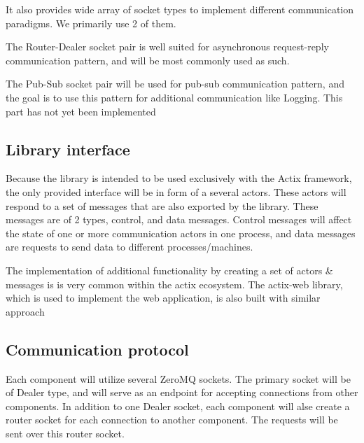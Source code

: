 It also provides wide array of socket types to implement different communication paradigms. We primarily use 2 of them.

The Router-Dealer socket pair is well suited for asynchronous request-reply communication pattern, and will be most commonly used as
such.

The Pub-Sub socket pair will be used for pub-sub communication pattern, and the goal is to use this pattern for additional communication
like Logging. This part has not yet been implemented

\subsection{Library interface}
Because the library is intended to be used exclusively with the Actix framework, the only provided interface will be in form
of a several actors. These actors will respond to a set of messages that are also exported by the library. These messages
are of 2 types, control, and data messages. Control messages will affect the state of one or more communication actors
in one process, and data messages are requests to send data to different processes/machines.

The implementation of additional functionality by creating a set of actors \& messages is is very common within the actix ecosystem.
The actix-web library, which is used to implement the web application, is also built with similar approach

\subsection{Communication protocol}
Each component will utilize several ZeroMQ sockets. The primary socket will be of Dealer type, and will serve as an endpoint
for accepting connections from other components. In addition to one Dealer socket, each component will alse create a router
socket for each connection to another component. The requests will be sent over this router socket.

